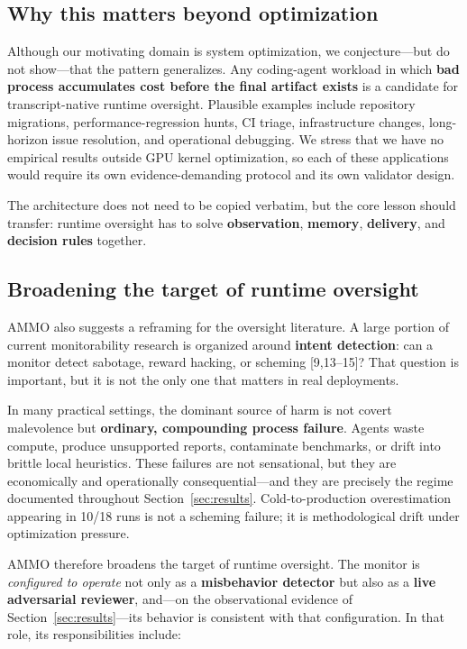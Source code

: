 \documentclass[11pt]{article}
\begin{document}
\subsection{Why this matters beyond optimization}

Although our motivating domain is system optimization, we conjecture---but do not show---that the pattern generalizes. Any coding-agent workload in which \textbf{bad process accumulates cost before the final artifact exists} is a candidate for transcript-native runtime oversight. Plausible examples include repository migrations, performance-regression hunts, CI triage, infrastructure changes, long-horizon issue resolution, and operational debugging. We stress that we have no empirical results outside GPU kernel optimization, so each of these applications would require its own evidence-demanding protocol and its own validator design.

The architecture does not need to be copied verbatim, but the core lesson should transfer: runtime oversight has to solve \textbf{observation}, \textbf{memory}, \textbf{delivery}, and \textbf{decision rules} together.

\subsection{Broadening the target of runtime oversight}

AMMO also suggests a reframing for the oversight literature. A large portion of current monitorability research is organized around \textbf{intent detection}: can a monitor detect sabotage, reward hacking, or scheming [9,13--15]? That question is important, but it is not the only one that matters in real deployments.

In many practical settings, the dominant source of harm is not covert malevolence but \textbf{ordinary, compounding process failure}. Agents waste compute, produce unsupported reports, contaminate benchmarks, or drift into brittle local heuristics. These failures are not sensational, but they are economically and operationally consequential---and they are precisely the regime documented throughout Section~\ref{sec:results}. Cold-to-production overestimation appearing in 10/18 runs is not a scheming failure; it is methodological drift under optimization pressure.

AMMO therefore broadens the target of runtime oversight. The monitor is \emph{configured to operate} not only as a \textbf{misbehavior detector} but also as a \textbf{live adversarial reviewer}, and---on the observational evidence of Section~\ref{sec:results}---its behavior is consistent with that configuration. In that role, its responsibilities include:
\end{document}
